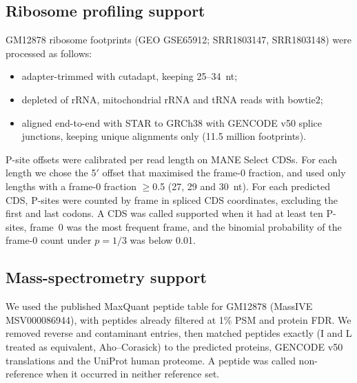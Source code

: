 \subsection{Ribosome profiling support}
GM12878 ribosome footprints \citep{Cenik2015} (GEO GSE65912; SRR1803147, SRR1803148) were processed
as follows:
\begin{itemize}
  \item adapter-trimmed with cutadapt, keeping 25--34~nt;
  \item depleted of rRNA, mitochondrial rRNA and tRNA reads with bowtie2;
  \item aligned end-to-end with STAR to GRCh38 with GENCODE v50 splice junctions, keeping unique
  alignments only (11.5 million footprints).
\end{itemize}
P-site offsets were calibrated per read length on MANE Select CDSs. For each length we chose the
5$'$ offset that maximised the frame-0 fraction, and used only lengths with a frame-0 fraction
$\ge$0.5 (27, 29 and 30~nt). For each predicted CDS, P-sites were counted by frame in spliced CDS
coordinates, excluding the first and last codons. A CDS was called supported when it had at least
ten P-sites, frame~0 was the most frequent frame, and the binomial probability of the frame-0 count
under $p=1/3$ was below 0.01.

\subsection{Mass-spectrometry support}
We used the published MaxQuant peptide table for GM12878 \citep{Sinitcyn2023} (MassIVE
MSV000086944), with peptides already filtered at 1\% PSM and protein FDR. We removed reverse and
contaminant entries, then matched peptides exactly (I and L treated as equivalent, Aho--Corasick)
to the predicted proteins, GENCODE v50 translations and the UniProt human proteome. A peptide was
called non-reference when it occurred in neither reference set.
